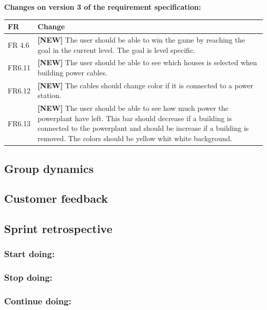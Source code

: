 	{\bf Changes on version 3 of the requirement specification:} \\
	\begin{tabular}{| p{1.5cm} | p{12cm} |}
		\hline
		\rowcolor{lightgray}
		{\bf FR} & {\bf Change} \\ \hline
		FR 4.6 & {\bf \color{green}[NEW]} The user should be able to win the game by reaching the goal in the current level. The goal is level specific. \\ \hline
		FR6.11 & {\bf \color{green}[NEW]} The user should be able to see which houses is selected when building power cables. \\ \hline
		FR6.12 & {\bf \color{green}[NEW]} The cables should change color if it is connected to a power 
		station. \\ \hline
		FR6.13 & {\bf \color{green}[NEW]} The user should be able to see how much power the powerplant have left. 
		This bar should decrease if a building is connected to the powerplant and should be 
		increase if a building is removed. The colors should be yellow whit white 
		background. \\ \hline
	\end{tabular}


\subsection{Group dynamics}

\subsection{Customer feedback}

\subsection{Sprint retrospective}
	\subsubsection*{Start doing: } 
	\subsubsection*{Stop doing: }
	\subsubsection*{Continue doing: }